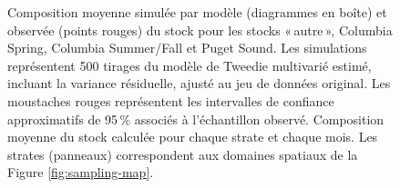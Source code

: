 \begin{figure}[htb]
    \centering
    \caption{Composition moyenne simulée par modèle (diagrammes en boîte) et observée (points rouges) du stock pour les stocks «\,autre\,», Columbia Spring, Columbia Summer/Fall et Puget Sound. Les simulations représentent 500 tirages du modèle de Tweedie multivarié estimé, incluant la variance résiduelle, ajusté au jeu de données original. Les moustaches rouges représentent les intervalles de confiance approximatifs de 95\,\% associés à l'échantillon observé. Composition moyenne du stock calculée pour chaque strate et chaque mois. Les strates (panneaux) correspondent aux domaines spatiaux de la Figure \ref{fig:sampling-map}.}
    \label{fig:posterior-stock1}
\end{figure}

